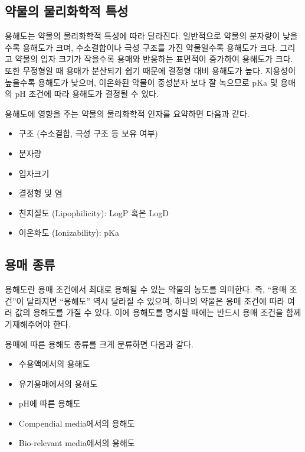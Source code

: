\documentclass[
  11pt,
  krantz2, a4paper, twoside]{krantz}
\providecommand{\tightlist}{%
  \setlength{\itemsep}{0pt}\setlength{\parskip}{0pt}}
\begin{document}
\hypertarget{uxc57duxbb3cuxc758-uxbb3cuxb9acuxd654uxd559uxc801-uxd2b9uxc131}{%
\subsection{약물의 물리화학적 특성}\label{uxc57duxbb3cuxc758-uxbb3cuxb9acuxd654uxd559uxc801-uxd2b9uxc131}}

용해도는 약물의 물리화학적 특성에 따라 달라진다. 일반적으로 약물의 분자량이 낮을수록 용해도가 크며, 수소결합이나 극성 구조를 가진 약물일수록 용해도가 크다.
그리고 약물의 입자 크기가 작을수록 용매와 반응하는 표면적이 증가하여 용해도가 크다.
또한 무정형일 때 용매가 분산되기 쉽기 때문에 결정형 대비 용해도가 높다.
지용성이 높을수록 용해도가 낮으며, 이온화된 약물이 중성분자 보다 잘 녹으므로 pKa 및 용매의 pH 조건에 따라 용해도가 결정될 수 있다.

용해도에 영향을 주는 약물의 물리화학적 인자를 요약하면 다음과 같다.

\begin{itemize}
\tightlist
\item
  구조 (수소결합, 극성 구조 등 보유 여부)
\item
  분자량
\item
  입자크기
\item
  결정형 및 염
\item
  친지질도 (Lipophilicity): LogP 혹은 LogD
\item
  이온화도 (Ionizability): pKa
\end{itemize}

\hypertarget{uxc6a9uxb9e4-uxc885uxb958}{%
\subsection{용매 종류}\label{uxc6a9uxb9e4-uxc885uxb958}}

용해도란 용매 조건에서 최대로 용해될 수 있는 약물의 농도를 의미한다.
즉, ``용매 조건''이 달라지면 ``용해도'' 역시 달라질 수 있으며, 하나의 약물은 용매 조건에 따라 여러 값의 용해도를 가질 수 있다.
이에 용해도를 명시할 때에는 반드시 용매 조건을 함께 기재해주어야 한다.

용매에 따른 용해도 종류를 크게 분류하면 다음과 같다.

\begin{itemize}
\tightlist
\item
  수용액에서의 용해도
\item
  유기용매에서의 용해도
\item
  pH에 따른 용해도
\item
  Compendial media에서의 용해도
\item
  Bio-relevant media에서의 용해도
\end{itemize}
\end{document}
